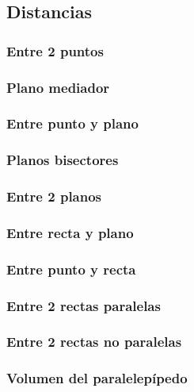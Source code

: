 \subsection{Distancias}
\subsubsection{Entre 2 puntos}
\subsubsection{Plano mediador}
\subsubsection{Entre punto y plano}
\subsubsection{Planos bisectores}
\subsubsection{Entre 2 planos}
\subsubsection{Entre recta y plano}
\subsubsection{Entre punto y recta}
\subsubsection{Entre 2 rectas paralelas}
\subsubsection{Entre 2 rectas no paralelas}

\subsubsection{Volumen del paralelepípedo}
